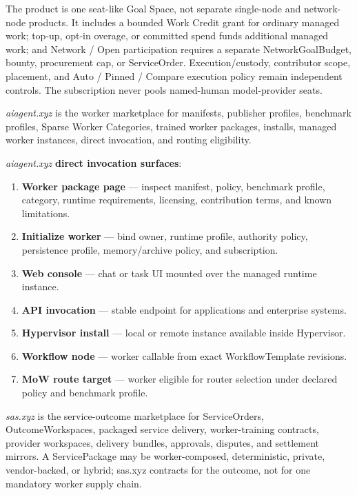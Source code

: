 \documentclass[
  11pt,
]{article}
\providecommand{\tightlist}{%
  \setlength{\itemsep}{0pt}\setlength{\parskip}{0pt}}
\begin{document}
The product is one seat-like Goal Space, not separate single-node and
network-node products. It includes a bounded Work Credit grant for
ordinary managed work; top-up, opt-in overage, or committed spend funds
additional managed work; and Network / Open participation requires a
separate NetworkGoalBudget, bounty, procurement cap, or ServiceOrder.
Execution/custody, contributor scope, placement, and Auto / Pinned /
Compare execution policy remain independent controls. The subscription
never pools named-human model-provider seats.

\emph{aiagent.xyz} is the worker marketplace for manifests, publisher
profiles, benchmark profiles, Sparse Worker Categories, trained worker
packages, installs, managed worker instances, direct invocation, and
routing eligibility.

\emph{aiagent.xyz} \textbf{direct invocation surfaces}:

\begin{enumerate}
\def\labelenumi{\arabic{enumi}.}
\tightlist
\item
  \textbf{Worker package page} --- inspect manifest, policy, benchmark
  profile, category, runtime requirements, licensing, contribution
  terms, and known limitations.
\item
  \textbf{Initialize worker} --- bind owner, runtime profile, authority
  policy, persistence profile, memory/archive policy, and subscription.
\item
  \textbf{Web console} --- chat or task UI mounted over the managed
  runtime instance.
\item
  \textbf{API invocation} --- stable endpoint for applications and
  enterprise systems.
\item
  \textbf{Hypervisor install} --- local or remote instance available
  inside Hypervisor.
\item
  \textbf{Workflow node} --- worker callable from exact WorkflowTemplate
  revisions.
\item
  \textbf{MoW route target} --- worker eligible for router selection
  under declared policy and benchmark profile.
\end{enumerate}

\emph{sas.xyz} is the service-outcome marketplace for ServiceOrders,
OutcomeWorkspaces, packaged service delivery, worker-training
contracts, provider workspaces, delivery bundles, approvals, disputes,
and settlement mirrors. A ServicePackage may be worker-composed,
deterministic, private, vendor-backed, or hybrid; sas.xyz contracts for
the outcome, not for one mandatory worker supply chain.
\end{document}
